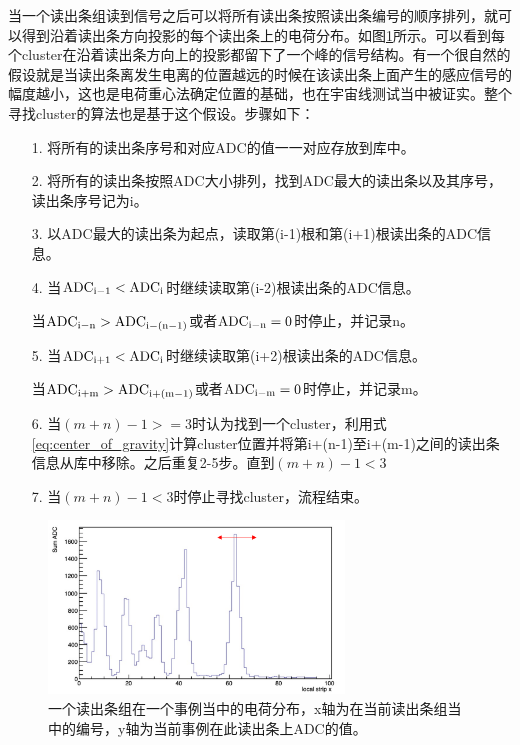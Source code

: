 当一个读出条组读到信号之后可以将所有读出条按照读出条编号的顺序排列，就可以得到沿着读出条方向投影的每个读出条上的电荷分布。如图\ref{fig:ADC_Group_Projection}所示。可以看到每个cluster在沿着读出条方向上的投影都留下了一个峰的信号结构。有一个很自然的假设就是当读出条离发生电离的位置越远的时候在该读出条上面产生的感应信号的幅度越小，这也是电荷重心法确定位置的基础，也在宇宙线测试当中被证实。整个寻找cluster的算法也是基于这个假设。步骤如下：
\begin{itemize}
    \item[1.] 将所有的读出条序号和对应ADC的值一一对应存放到库中。
    \item[2.] 将所有的读出条按照ADC大小排列，找到ADC最大的读出条以及其序号，读出条序号记为i。
    \item[3.] 以ADC最大的读出条为起点，读取第(i-1)根和第(i+1)根读出条的ADC信息。
    \item[4.] 当${\rm ADC_{i-1} < ADC_{i}}$时继续读取第(i-2)根读出条的ADC信息。 

              当${\rm ADC_{i-n} > ADC_{i-(n-1)}}$或者${\rm ADC_{i-n} = 0}$时停止，并记录n。
    \item[5.] 当${\rm ADC_{i+1} < ADC_{i}}$时继续读取第(i+2)根读出条的ADC信息。

              当${\rm ADC_{i+m} > ADC_{i+(m-1)}}$或者${\rm ADC_{i-m} = 0}$时停止，并记录m。
    \item[6.] 当$(m+n)-1 >= 3$时认为找到一个cluster，利用式\ref{eq:center_of_gravity}计算cluster位置并将第i+(n-1)至i+(m-1)之间的读出条信息从库中移除。之后重复2-5步。直到$(m+n)-1 < 3$
    \item[7.] 当$(m+n)-1 < 3$时停止寻找cluster，流程结束。
\end{itemize}
\begin{figure}[htb]
    \begin{center}
    \includegraphics[width=0.7\textwidth,clip]{figures/Chapter3/ADC_Group_Projection.png}
    \end{center}
    \caption[一个读出条组在一个事例当中的电荷分布]{一个读出条组在一个事例当中的电荷分布，x轴为在当前读出条组当中的编号，y轴为当前事例在此读出条上ADC的值。}
    \label{fig:ADC_Group_Projection}
\end{figure}

